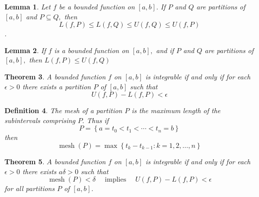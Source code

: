\documentclass[12pt]{article}
\newtheorem{theorem}{Theorem}[section]
\newtheorem{lemma}[theorem]{Lemma}
\newtheorem{definition}[theorem]{Definition}
\begin{document}
\begin{lemma}
	Let $f$ be a bounded function on $[ a , b ] .$ If $P$ and $Q$ are partitions of
	$[ a , b ]$ and $P \subseteq Q ,$ then $$
	L ( f , P ) \leq L ( f , Q ) \leq U ( f , Q ) \leq U ( f , P )
	$$.
\end{lemma}
\begin{lemma}
	If $f$ is a bounded function on $[ a , b ] ,$ and if $P$ and $Q$ are partitions of
	$[ a , b ] ,$ then $L ( f , P ) \leq U ( f , Q )$
\end{lemma}
\begin{theorem}
	A bounded function $f$ on $[ a , b ]$ is integrable if and only if for each
	$\epsilon > 0$ there exists a partition $P$ of $[ a , b ]$ such that $$
	U ( f , P ) - L ( f , P ) < \epsilon
	$$
\end{theorem}
\begin{definition}
	The mesh of a partition $P$ is the maximum length of the subintervals
	comprising $P .$ Thus if $$
	P = \left\{ a = t _ { 0 } < t _ { 1 } < \cdots < t _ { n } = b \right\}
	$$ then $$
	\operatorname { mesh } ( P ) = \max \left\{ t _ { k } - t _ { k - 1 } : k = 1,2 , \ldots , n \right\}
	$$
\end{definition}
\begin{theorem}
	$A$ bounded function $f$ on $[ a , b ]$ is integrable if and only if for each
	$\epsilon > 0$ there exists $a \delta > 0$ such that $$
	\operatorname { mesh } ( P ) < \delta \quad \text { implies } \quad U ( f , P ) - L ( f , P ) < \epsilon
	$$ for all partitions $P$ of $[ a , b ]$.
\end{theorem}
\end{document}
